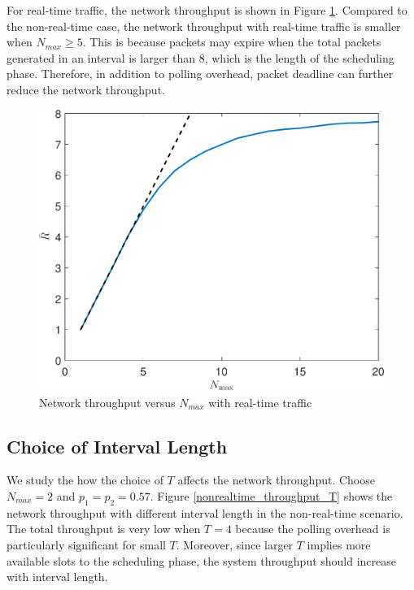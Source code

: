 \documentclass{article}
\begin{document}
For real-time traffic, the network throughput is shown in Figure \ref{realtime_throughput_randmax}. Compared to the non-real-time case, the network throughput with real-time traffic is smaller when $N_{max}\geq 5$. This is because packets may expire when the total packets generated in an interval is larger than 8, which is the length of the scheduling phase. Therefore, in addition to polling overhead, packet deadline can further reduce the network throughput. 

\begin{figure}[htbp]
\centering
\includegraphics[width=.6\textwidth]{realtime_throughput_randmax.pdf}
\caption{Network throughput versus $N_{max}$ with real-time traffic}
\label{realtime_throughput_randmax}
\end{figure}

\subsection{Choice of Interval Length}
We study the how the choice of $T$ affects the network throughput. Choose $N_{max}=2$ and $p_1 = p_2 = 0.57$. Figure \ref{nonrealtime_throughput_T} shows the network throughput with different interval length in the non-real-time scenario. The total throughput is very low when $T=4$ because the polling overhead is particularly significant for small $T$. Moreover, since larger $T$ implies more available slots to the scheduling phase, the system throughput should increase with interval length. 

\end{document}
